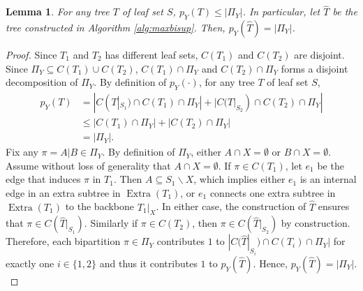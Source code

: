 \documentclass{article}
\DeclareMathOperator*{\extra}{Extra}
\newtheorem{lemma}{Lemma}
\begin{document}
\begin{lemma}\label{lem:max_pY}
    For any tree $T$ of leaf set $S$, $p_Y(T) \le |\Pi_Y|$. In particular, let $\hat{T}$ be the tree constructed in Algorithm \ref{alg:maxbisup}. Then, $p_Y(\hat{T}) = |\Pi_Y|$. 
\end{lemma}
\begin{proof}
    Since $T_1$ and $T_2$ has different leaf sets, $C(T_1)$ and $C(T_2)$ are disjoint. Since $\Pi_Y \subseteq C(T_1)\cup C(T_2)$, $C(T_1) \cap \Pi_Y$ and $C(T_2)\cap \Pi_Y$ forms a disjoint decomposition of $\Pi_Y$. By definition of $p_Y(\cdot)$, for any tree $T$ of leaf set $S$,
    \begin{align*}
        p_Y(T) &= |C(T|_{S_1}) \cap C(T_1) \cap \Pi_Y| + |C(T|_{S_2}) \cap C(T_2) \cap \Pi_Y| \\
        &\le |C(T_1) \cap \Pi_Y| + | C(T_2) \cap \Pi_Y| \\
        &= |\Pi_Y|.
    \end{align*}
    Fix any $\pi = A|B \in \Pi_Y$. By definition of $\Pi_Y$, either $A \cap X = \emptyset$ or $B \cap X = \emptyset$. Assume without loss of generality that $A \cap X = \emptyset$. If $\pi \in C(T_1)$, let $e_1$ be the edge that induces $\pi$ in $T_1$. Then $A \subseteq S_1 \backslash X$, which implies either $e_1$ is an internal edge in an extra subtree in $\extra(T_1)$, or $e_1$ connects one extra subtree in $\extra(T_1)$ to the backbone $T_1|_X$. In either case, the construction of $\hat{T}$ ensures that $\pi \in C(\hat{T}|_{S_1})$. Similarly if $\pi \in C(T_2)$, then $\pi \in C(\hat{T}|_{S_2})$ by construction. Therefore, each bipartition $\pi \in \Pi_Y$ contributes $1$ to $|C(\hat{T}|_{S_i}) \cap C(T_i) \cap \Pi_Y|$ for exactly one $i \in \{1,2\}$ and thus it contributes $1$ to $p_Y(\hat{T})$. Hence, $p_Y(\hat{T}) = |\Pi_Y|$.\\
\end{proof}
\end{document}
